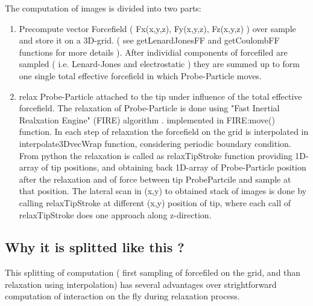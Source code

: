 The computation of images is divided into two parts:
\begin{enumerate}
    \item Precompute vector Forcefield ( Fx(x,y,z), Fy(x,y,z), Fz(x,y,z) ) over
    sample and store it on a 3D-grid. ( see getLenardJonesFF and getCoulombFF
    functions for more details ). After individial components of forcefiled are
    sampled ( i.e. Lenard-Jones and electrostatic ) they are summed up to form
    one single total effective forcefield in which Probe-Particle moves.

    \item relax Probe-Particle attached to the tip under influence of the total
    effective forcefield. The relaxation of Probe-Particle is done using "Fast
    Inertial Realxation Engine" (FIRE) algorithm
    \cite{ebitzekstructrelaxmadesimple}. implemented in
    FIRE:move() function. In each step of relaxation the forcefield on the grid
    is interpolated in interpolate3DvecWrap function, considering periodic
    boundary condition. From python the relaxation is called as relaxTipStroke
    function providing 1D-array of tip positions, and obtaining back 1D-array of
    Probe-Particle position after the relaxation and of force between tip
    ProbePartcile and sample at that position. The lateral scan in (x,y) to
    obtained stack of images is done by calling relaxTipStroke at different
    (x,y) position of tip, where each call of relaxTipStroke does one approach
    along z-direction.

\end{enumerate}

\subsection{Why it is splitted like this ?}

This splitting of computation ( first sampling of forcefiled on the grid, and
than relaxation using interpolation) has several advantages over strightforward
computation of interaction on the fly during relaxation process.


